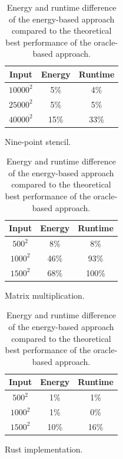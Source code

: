 \begin{table}[ht]
    \centering
    \begin{subtable}{0.33\linewidth}
        \centering
        \begin{tabular}{ccc}\hline
            Input     & Energy & Runtime \\\hline
            $10000^2$ &    5\% &     4\% \\
            $25000^2$ &    5\% &     5\% \\
            $40000^2$ &   15\% &    33\% \\\hline
        \end{tabular}
        \caption{Nine-point stencil.}
        \label{tab:oracle-stencil}
    \end{subtable}%
    \begin{subtable}{0.33\linewidth}
        \centering
        \begin{tabular}{ccc}\hline
            Input    & Energy & Runtime \\\hline
            $ 500^2$ &    8\% &     8\% \\
            $1000^2$ &   46\% &    93\% \\
            $1500^2$ &   68\% &   100\% \\\hline
        \end{tabular}
        \caption{Matrix multiplication.}
        \label{tab:oracle-matmul}
    \end{subtable}%
    \begin{subtable}{0.33\linewidth}
        \centering
        \begin{tabular}{ccc}\hline
            Input    & Energy & Runtime \\\hline
            $ 500^2$ &    1\% &     1\% \\
            $1000^2$ &    1\% &     0\% \\
            $1500^2$ &   10\% &    16\% \\\hline
        \end{tabular}
        \caption{Rust implementation.}
        \label{tab:oracle-rust}
    \end{subtable}%
    \caption{Energy and runtime difference of the energy-based approach compared to the theoretical
    best performance of the oracle-based approach.}
    \label{fig:oracle}
\end{table}

